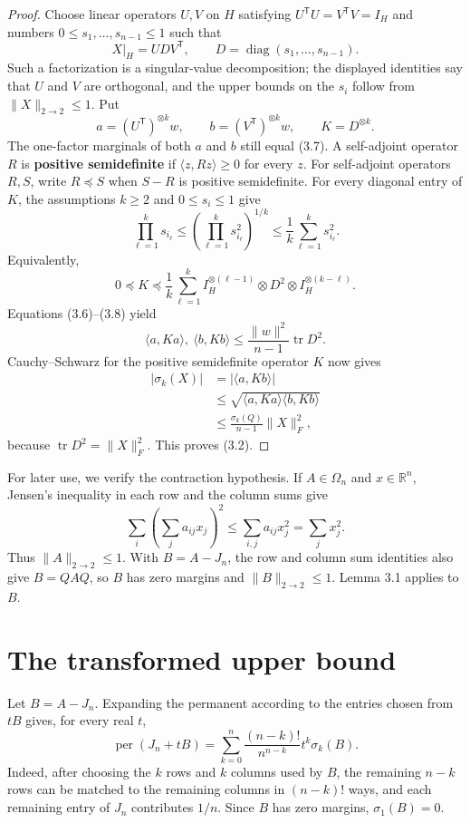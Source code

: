 \documentclass[11pt]{article}
\begin{document}
\begin{proof}
Choose linear operators $U,V$ on $H$ satisfying
$U^{\mathsf T}U=V^{\mathsf T}V=I_H$ and numbers
$0\le s_1,\ldots,s_{n-1}\le1$ such that
\[
X|_H=UDV^{\mathsf T},
\qquad
D=\operatorname{diag}(s_1,\ldots,s_{n-1}).
\]
Such a factorization is a singular-value decomposition; the displayed
identities say that $U$ and $V$ are orthogonal, and the upper bounds on the
$s_i$ follow from $\|X\|_{2\to2}\le1$. Put
\[
a=(U^{\mathsf T})^{\otimes k}w,
\qquad
b=(V^{\mathsf T})^{\otimes k}w,
\qquad
K=D^{\otimes k}.
\]
The one-factor marginals of both $a$ and $b$ still equal (3.7). A self-adjoint
operator $R$ is \textbf{positive semidefinite} if
$\langle z,Rz\rangle\ge0$ for every $z$. For self-adjoint operators $R,S$,
write $R\preceq S$ when $S-R$ is positive semidefinite. For every diagonal
entry of $K$, the assumptions $k\ge2$ and $0\le s_i\le1$ give
\[
\prod_{\ell=1}^k s_{i_\ell}
\le\left(\prod_{\ell=1}^k s_{i_\ell}^2\right)^{1/k}
\le\frac1k\sum_{\ell=1}^k s_{i_\ell}^2.
\]
Equivalently,
\[
0\preceq K\preceq\frac1k\sum_{\ell=1}^k
I_H^{\otimes(\ell-1)}\otimes D^2\otimes
I_H^{\otimes(k-\ell)}.
\tag{3.8}
\]
Equations (3.6)--(3.8) yield
\[
\langle a,Ka\rangle,\ \langle b,Kb\rangle
\le\frac{\|w\|^2}{n-1}\operatorname{tr}D^2.
\]
Cauchy--Schwarz for the positive semidefinite operator $K$ now gives
\[
\begin{aligned}
|\sigma_k(X)|
&=|\langle a,Kb\rangle|\\
&\le\sqrt{\langle a,Ka\rangle\langle b,Kb\rangle}\\
&\le\frac{\sigma_k(Q)}{n-1}\|X\|_F^2,
\end{aligned}
\]
because $\operatorname{tr}D^2=\|X\|_F^2$. This proves (3.2).
\end{proof}

For later use, we verify the contraction hypothesis. If $A\in\Omega_n$ and
$x\in\mathbb R^n$, Jensen's inequality in each row and the column sums give
\[
\sum_i\left(\sum_j a_{ij}x_j\right)^2
\le\sum_{i,j}a_{ij}x_j^2
=\sum_jx_j^2.
\tag{3.9}
\]
Thus $\|A\|_{2\to2}\le1$. With $B=A-J_n$, the row and column sum identities
also give $B=QAQ$, so $B$ has zero margins and $\|B\|_{2\to2}\le1$.
Lemma 3.1 applies to $B$.

\section{The transformed upper bound}

Let $B=A-J_n$. Expanding the permanent according to the entries chosen from
$tB$ gives, for every real $t$,
\[
\operatorname{per}(J_n+tB)
=\sum_{k=0}^n\frac{(n-k)!}{n^{n-k}}t^k\sigma_k(B).
\tag{4.1}
\]
Indeed, after choosing the $k$ rows and $k$ columns used by $B$, the remaining
$n-k$ rows can be matched to the remaining columns in $(n-k)!$ ways, and each
remaining entry of $J_n$ contributes $1/n$. Since $B$ has zero margins,
$\sigma_1(B)=0$.
\end{document}
